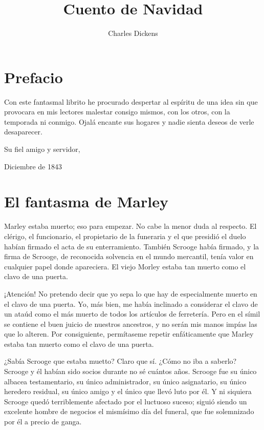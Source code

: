 \documentclass{novela}
\title{Cuento de Navidad}
\author{Charles Dickens}
\date{}
\begin{document}
\frontmatter
	\maketitle
	\tableofcontents
	\chapter{Prefacio}


 Con este fantasmal librito he procurado despertar al espíritu de una idea sin que provocara en mis lectores malestar consigo mismos, con los otros, con la temporada ni conmigo. Ojalá encante sus hogares y nadie sienta deseos de verle desaparecer.


 Su fiel amigo y servidor,


 Diciembre de 1843


 \mainmatter%
 \chapter{El fantasma de Marley}


 Marley estaba muerto; eso para empezar. No cabe la menor duda al respecto. El clérigo, el funcionario, el propietario de la funeraria y el que presidió el duelo habían firmado el acta de su enterramiento. También Scrooge había firmado, y la firma de Scrooge, de reconocida solvencia en el mundo mercantil, tenía valor en cualquier papel donde apareciera. El viejo Morley estaba tan muerto como el clavo de una puerta.

 ¡Atención! No pretendo decir que yo sepa lo que hay de especialmente muerto en el clavo de una puerta. Yo, más bien, me había inclinado a considerar el clavo de un ataúd como el más muerto de todos los artículos de ferretería. Pero en el símil se contiene el buen juicio de nuestros ancestros, y no serán mis manos impías las que lo alteren. Por consiguiente, permítaseme repetir enfáticamente que Marley estaba tan muerto como el clavo de una puerta.

 ¿Sabía Scrooge que estaba muetto? Claro que sí. ¿Cómo no iba a saberlo? Scrooge y él habían sido socios durante no sé cuántos años. Scrooge fue su único albacea testamentario, su único administrador, su único asignatario, su único heredero residual, su único amigo y el único que llevó luto por él. Y ni siquiera Scrooge quedó terriblemente afectado por el luctuoso suceso; siguió siendo un excelente hombre de negocios el mismísimo día del funeral, que fue solemnizado por él a precio de ganga.
\end{document}
